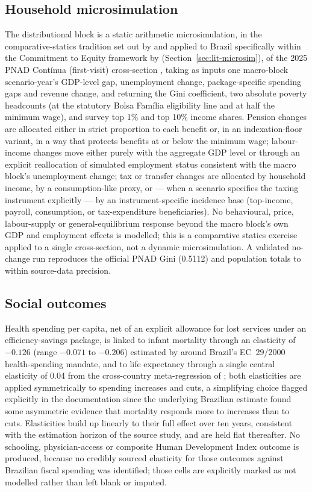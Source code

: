 \documentclass[11pt,a4paper]{article}
\begin{document}
\subsection{Household microsimulation}

The distributional block is a static arithmetic microsimulation, in the comparative-statics tradition set out by \citet{bourguignonspadaro2006} and applied to Brazil specifically within the Commitment to Equity framework by \citet{higginspereira2014} (Section~\ref{sec:lit-microsim}), of the 2025 PNAD Cont\'inua (first-visit) cross-section \citep{pnad2025}, taking as inputs one macro-block scenario-year's GDP-level gap, unemployment change, package-specific spending gaps and revenue change, and returning the Gini coefficient, two absolute poverty headcounts (at the statutory Bolsa Fam\'ilia eligibility line and at half the minimum wage), and survey top 1\% and top 10\% income shares. Pension changes are allocated either in strict proportion to each benefit or, in an indexation-floor variant, in a way that protects benefits at or below the minimum wage; labour-income changes move either purely with the aggregate GDP level or through an explicit reallocation of simulated employment status consistent with the macro block's unemployment change; tax or transfer changes are allocated by household income, by a consumption-like proxy, or --- when a scenario specifies the taxing instrument explicitly --- by an instrument-specific incidence base (top-income, payroll, consumption, or tax-expenditure beneficiaries). No behavioural, price, labour-supply or general-equilibrium response beyond the macro block's own GDP and employment effects is modelled; this is a comparative statics exercise applied to a single cross-section, not a dynamic microsimulation. A validated no-change run reproduces the official PNAD Gini (0.5112) and population totals to within source-data precision.

\subsection{Social outcomes}

Health spending per capita, net of an explicit allowance for lost services under an efficiency-savings package, is linked to infant mortality through an elasticity of $-0.126$ (range $-0.071$ to $-0.206$) estimated by \citet{szkloclarkerocha2024} around Brazil's EC~29/2000 health-spending mandate, and to life expectancy through a single central elasticity of 0.04 from the cross-country meta-regression of \citet{gallet2017}; both elasticities are applied symmetrically to spending increases and cuts, a simplifying choice flagged explicitly in the documentation since the underlying Brazilian estimate found some asymmetric evidence that mortality responds more to increases than to cuts. Elasticities build up linearly to their full effect over ten years, consistent with the estimation horizon of the source study, and are held flat thereafter. No schooling, physician-access or composite Human Development Index outcome is produced, because no credibly sourced elasticity for those outcomes against Brazilian fiscal spending was identified; those cells are explicitly marked as not modelled rather than left blank or imputed.
\end{document}
